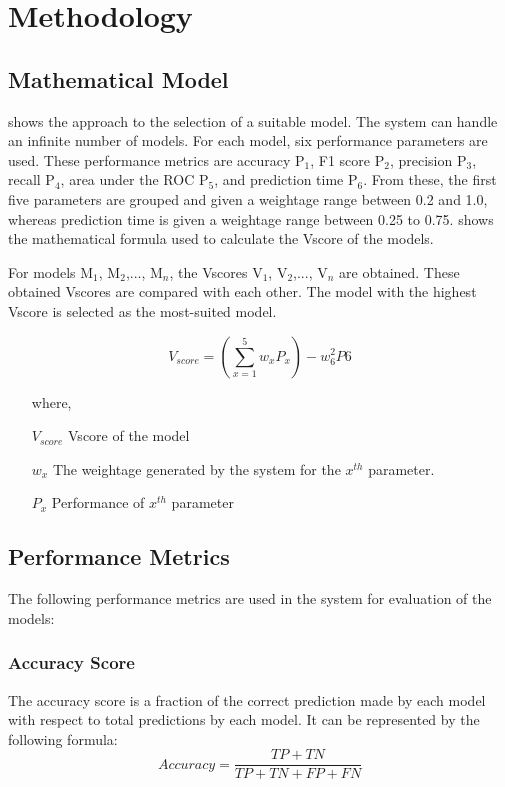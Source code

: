 \documentclass[a4paper,fleqn]{cas-dc}
\newcommand{\responsemod}{\color{blue}}
\begin{document}
\FloatBarrier
\section{Methodology} \label{sec:methodology}

\subsection{Mathematical Model}\label{subsec:mathematical_model}
{\responsemod
{} shows the approach to the selection of a suitable model. The system can handle an infinite number of models. For each model, six performance parameters are used. These performance metrics are accuracy P$_1$, F1 score P$_2$, precision P$_3$, recall P$_4$, area under the ROC P$_5$, and prediction time P$_6$. From these, the first five parameters are grouped and given a weightage range between 0.2 and 1.0, whereas prediction time is given a weightage range between 0.25 to 0.75.  shows the mathematical formula used to calculate the Vscore of the models.

For models M$_1$, M$_2$,..., M$_n$, the Vscores V$_1$, V$_2$,..., V$_n$ are obtained. These obtained Vscores are compared with each other. The model with the highest Vscore is selected as the most-suited model.}

\begin{equation}\label{eq:v_score}
    V_{score} = \left(\sum_{x=1}^{5} w_xP_x\right) - w_6^2P6
\end{equation}

\begin{itemize}
    \item[where,]
    \item[$V_{score}$] Vscore of the model
    \item[$w_x$] The weightage generated by the system for the $x^{th}$ parameter.
    \item[$P_x$] Performance of $x^{th}$ parameter
\end{itemize}

\subsection{Performance Metrics} \label{subsec:performance_metrics}
The following performance metrics are used in the system for evaluation of the models:

\subsubsection{Accuracy Score}\label{subsubsec:accuracy_score}
The accuracy score is a fraction of the correct prediction made by each model with respect to total predictions by each model. It can be represented by the following formula:
\begin{equation*}\label{eq:accuracy_score}
    Accuracy = \frac{TP+TN}{TP+TN+FP+FN}
\end{equation*}
\end{document}
